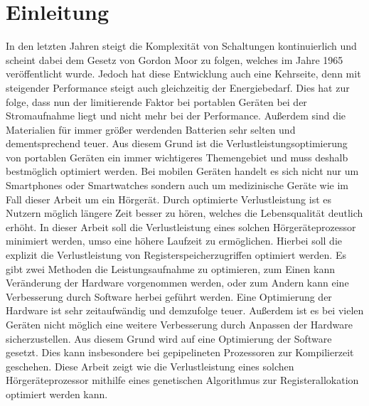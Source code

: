 
\thispagestyle{empty}
%
\chapter{Einleitung}
\label{chap:introduction}
In den letzten Jahren steigt die Komplexität von Schaltungen kontinuierlich und scheint dabei dem Gesetz von Gordon Moor zu folgen, welches im Jahre 1965 veröffentlicht wurde. Jedoch hat diese Entwicklung auch eine Kehrseite, denn mit steigender Performance steigt auch gleichzeitig der Energiebedarf. Dies hat zur folge, dass nun der limitierende Faktor bei portablen Geräten bei der Stromaufnahme liegt und nicht mehr bei der Performance. Außerdem sind die Materialien für immer größer werdenden Batterien sehr selten und dementsprechend teuer. Aus diesem Grund ist die Verlustleistungsoptimierung von portablen Geräten ein immer wichtigeres Themengebiet und muss deshalb bestmöglich optimiert werden. Bei mobilen Geräten handelt es sich nicht nur um Smartphones oder Smartwatches sondern auch um medizinische Geräte wie im Fall dieser Arbeit um ein Hörgerät. Durch optimierte Verlustleistung ist es Nutzern möglich längere Zeit besser zu hören, welches die Lebensqualität deutlich erhöht.
In dieser Arbeit soll die Verlustleistung eines solchen Hörgeräteprozessor minimiert werden, umso eine höhere Laufzeit zu ermöglichen. Hierbei soll die explizit die Verlustleistung von Registerspeicherzugriffen optimiert werden. 
Es gibt zwei Methoden die Leistungsaufnahme zu optimieren, zum Einen kann Veränderung der Hardware vorgenommen werden, oder zum Andern kann eine Verbesserung durch Software herbei geführt werden. Eine Optimierung der Hardware ist sehr zeitaufwändig und demzufolge teuer. Außerdem ist es bei vielen Geräten nicht möglich eine weitere Verbesserung durch Anpassen der Hardware sicherzustellen. Aus diesem Grund wird auf eine Optimierung der Software gesetzt. Dies kann insbesondere bei gepipelineten Prozessoren zur Kompilierzeit geschehen. 
Diese Arbeit zeigt wie die Verlustleistung eines solchen Hörgeräteprozessor mithilfe eines genetischen Algorithmus zur Registerallokation optimiert werden kann.

